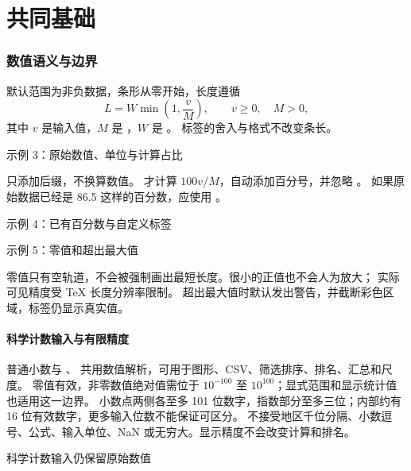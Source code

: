\part{共同基础}

\section{数值语义与边界}
默认范围为非负数据，条形从零开始，长度遵循
\[
  L=W\min\!\left(1,\frac{v}{M}\right),
  \qquad v\geq 0,\quad M>0,
\]
其中 $v$ 是输入值，$M$ 是 ，$W$ 是 。
标签的舍入与格式不改变条长。

\begin{example}{示例 3：原始数值、单位与计算占比}


\end{example}

 只添加后缀，不换算数值。
 才计算 $100v/M$，自动添加百分号，并忽略 。
如果原始数据已经是 86.5 这样的百分数，应使用 。

\begin{example}{示例 4：已有百分数与自定义标签}


\end{example}

\begin{example}{示例 5：零值和超出最大值}


\end{example}

零值只有空轨道，不会被强制画出最短长度。很小的正值也不会人为放大；
实际可见精度受 TeX 长度分辨率限制。
超出最大值时默认发出警告，并截断彩色区域，标签仍显示真实值。


\clearpage

\subsection{科学计数输入与有限精度}
普通小数与 、 共用数值解析，可用于图形、CSV、筛选排序、排名、汇总和尺度。
零值有效，非零数值绝对值需位于 $10^{-100}$ 至 $10^{100}$；显式范围和显示统计值也适用这一边界。
小数点两侧各至多 101 位数字，指数部分至多三位；内部约有 16 位有效数字，更多输入位数不能保证可区分。
不接受地区千位分隔、小数逗号、公式、输入单位、NaN 或无穷大。显示精度不会改变计算和排名。
\begin{example}{科学计数输入仍保留原始数值}
\end{example}
